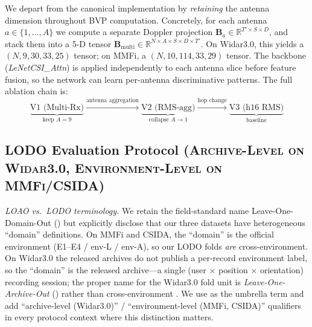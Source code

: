 \documentclass[11pt]{article}
\theoremstyle{definition}
\newcommand{\LODO}{\text{LODO}}
\newcommand{\LOAO}{\text{LOAO}}
\begin{document}
We depart from the canonical implementation by \emph{retaining} the antenna dimension throughout BVP computation. Concretely, for each antenna $a \in \{1, \ldots, A\}$ we compute a separate Doppler projection $\mathbf{B}_a \in \mathbb{R}^{T' \times S \times D}$, and stack them into a 5-D tensor $\mathbf{B}_{\text{multi}} \in \mathbb{R}^{N \times A \times S \times D \times T'}$. On Widar3.0, this yields a $(N, 9, 30, 33, 25)$ tensor; on MMFi, a $(N, 10, 114, 33, 29)$ tensor. The backbone (\textit{LeNetCSI\_Attn}) is applied independently to each antenna slice before feature fusion, so the network can learn per-antenna discriminative patterns. The full ablation chain is:
\begin{equation}
    \underbrace{\text{V1 (Multi-Rx)}}_{\text{keep } A=9}
    \xrightarrow{\text{antenna aggregation}}
    \underbrace{\text{V2 (RMS-agg)}}_{\text{collapse } A \to 1}
    \xrightarrow{\text{hop change}}
    \underbrace{\text{V3 (h16 RMS)}}_{\text{baseline}}
\end{equation}

\subsection{LODO Evaluation Protocol (\textsc{Archive-Level on Widar3.0, Environment-Level on MMFi/CSIDA})}
\label{sec:methodology-lodo}

\emph{LOAO vs.\ LODO terminology.} We retain the field-standard name Leave-One-Domain-Out (\LODO) but explicitly disclose that our three datasets have heterogeneous ``domain'' definitions. On MMFi and CSIDA, the ``domain'' is the official environment (E1--E4 / env-L / env-A), so our LODO folds \emph{are} cross-environment. On Widar3.0 the released archives do not publish a per-record environment label, so the ``domain'' is the released archive---a single (user $\times$ position $\times$ orientation) recording session; the proper name for the Widar3.0 fold unit is \emph{Leave-One-Archive-Out} (\LOAO) rather than cross-environment \LODO. We use \LODO{} as the umbrella term and add ``archive-level (Widar3.0)'' / ``environment-level (MMFi, CSIDA)'' qualifiers in every protocol context where this distinction matters.

\medskip
\end{document}
